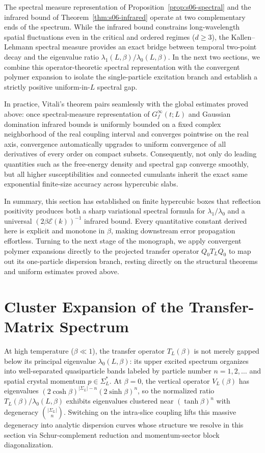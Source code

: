 \documentclass[11pt]{article}
\theoremstyle{definition}
\begin{document}
The spectral measure representation of Proposition~\ref{prop:s06-spectral} and the
infrared bound of Theorem~\ref{thm:s06-infrared} operate at two complementary ends
of the spectrum. While the infrared bound constrains long-wavelength spatial
fluctuations even in the critical and ordered regimes ($d \ge 3$), the
Kallen--Lehmann spectral measure provides an exact bridge between temporal two-point
decay and the eigenvalue ratio $\lambda_1(L, \beta) / \lambda_0(L, \beta)$. In the
next two sections, we combine this operator-theoretic spectral representation with
the convergent polymer expansion to isolate the single-particle excitation branch
and establish a strictly positive uniform-in-$L$ spectral gap.

In practice, Vitali's theorem pairs seamlessly with the global estimates proved
above: once spectral-measure representation of $G_f^\infty(t; L)$ and Gaussian
domination infrared bounds is uniformly bounded on a fixed complex neighborhood of
the real coupling interval and converges pointwise on the real axis, convergence
automatically upgrades to uniform convergence of all derivatives of every order on
compact subsets. Consequently, not only do leading quantities such as the
free-energy density and spectral gap converge smoothly, but all higher
susceptibilities and connected cumulants inherit the exact same exponential
finite-size accuracy across hypercubic slabs.

In summary, this section has established on finite hypercubic boxes that reflection
positivity produces both a sharp variational spectral formula for $\lambda_1 /
\lambda_0$ and a universal $(2\beta \mathcal{E}(k))^{-1}$ infrared bound. Every
quantitative constant derived here is explicit and monotone in $\beta$, making
downstream error propagation effortless. Turning to the next stage of the monograph,
we apply convergent polymer expansions directly to the projected transfer operator
$Q_0 T_L Q_0$ to map out its one-particle dispersion branch, resting directly on the
structural theorems and uniform estimates proved above.

\section{Cluster Expansion of the Transfer-Matrix Spectrum}
\label{sec:s07}

At high temperature ($\beta \ll 1$), the transfer operator $T_L(\beta)$ is not
merely gapped below its principal eigenvalue $\lambda_0(L, \beta)$: its upper
excited spectrum organizes into well-separated quasiparticle bands labeled by
particle number $n = 1, 2, \dots$ and spatial crystal momentum $p \in \Sigma_L^*$.
At $\beta = 0$, the vertical operator $V_L(\beta)$ has eigenvalues
$(2\cosh\beta)^{|\Sigma_L| - n} (2\sinh\beta)^n$, so the normalized ratio
$T_L(\beta) / \lambda_0(L, \beta)$ exhibits eigenvalues clustered near $(\tanh
\beta)^n$ with degeneracy $\binom{|\Sigma_L|}{n}$. Switching on the intra-slice
coupling lifts this massive degeneracy into analytic dispersion curves whose
structure we resolve in this section via Schur-complement reduction and
momentum-sector block diagonalization.
\end{document}

